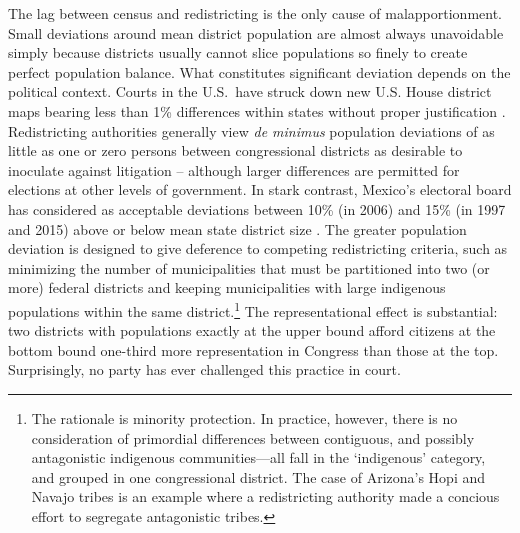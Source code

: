 \documentclass[letter,12pt]{article}
\begin{document}

The lag between census and redistricting is the only cause of malapportionment. Small deviations around mean district population are almost always unavoidable simply because districts usually cannot slice populations so finely to create perfect population balance. What constitutes significant deviation depends on the political context. Courts in the U.S.\ have struck down new U.S. House district maps bearing less than 1\% differences within states without proper justification \citep{tuckerApportionment.1985}. Redistricting authorities generally view \emph{de minimus} population deviations of as little as one or zero persons between congressional districts as desirable to inoculate against litigation -- although larger differences are permitted for elections at other levels of government. In stark contrast, Mexico's electoral board has considered as acceptable deviations between 10\% (in 2006) and 15\% (in 1997 and 2015) above or below mean state district size \citep{lujambio.vives.2008,trelles.mtz.polygob2012}. The greater population deviation is designed to give deference to competing redistricting criteria, such as minimizing the number of municipalities that must be partitioned into two (or more) federal districts and keeping municipalities with large indigenous populations within the same district.\footnote{The rationale is minority protection. In practice, however, there is no consideration of primordial differences between contiguous, and possibly antagonistic indigenous communities---all fall in the `indigenous' category, and grouped in one congressional district. The case of Arizona's Hopi and Navajo tribes is an example where a redistricting authority made a concious effort to segregate antagonistic tribes.} The representational effect is substantial: two districts with populations exactly at the upper bound afford citizens at the bottom bound one-third more representation in Congress than those at the top. Surprisingly, no party has ever challenged this practice in court. 
\end{document}
